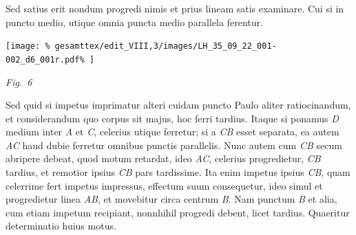 \vspace{1em}
%
\pstart
Sed satius erit nondum progredi
%
%
nimis et prius lineam
%
%
satis examinare. Cui si 
%
in puncto medio, utique omnia puncta medio parallela ferentur.
\pend 
% 
\vspace{1.0em} %
\centerline{%
\texttt{[image: \%
gesamttex/edit\_VIII,3/images/LH\_35\_09\_22\_001-002\_d6\_001r.pdf\%
]}} 
\vspace{0.5em}
\centerline{%
\lbrack\textit{Fig.~6}\rbrack%
}
\vspace{1em}
%
\pstart 
Sed quid si impetus\protect{} imprimatur alteri cuidam puncto 
%
%
Paulo aliter ratiocinandum, et considerandum quo corpus sit majus, hoc ferri tardius.
%
Itaque si ponamus \textit{D} medium inter \textit{A} et \textit{C},
%
%
celerius utique ferretur; si a \textit{CB} esset separata, ea autem \textit{AC} haud dubie ferretur omnibus punctis 
%
%
parallelis. Nunc autem cum \textit{CB} secum abripere debeat, quod motum retardat, ideo \textit{AC},
%
celerius progredietur, \textit{CB} tardius, et remotior ipsius \textit{CB} pars tardissime.
%
Ita enim impetus ipsius \textit{CB}, quam celerrime
%
%
fert impetus impressus\protect{}, effectum suum consequetur, ideo simul et 
%
progredietur linea \textit{AB}, et movebitur circa centrum \textit{B}. Nam punctum \textit{B} et alia, cum etiam 
%
impetum\protect{} recipiant, nonnhihil progredi debent, licet tardius.
\pend 
%
\pstart
Quaeritur determinatio huius motus.
\pend
%
%
\vspace{1.5em} %
